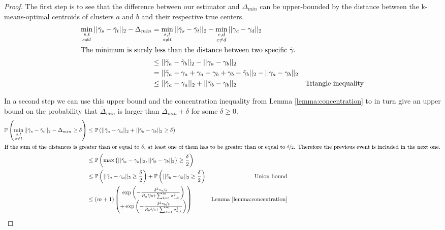 \documentclass[10pt,a4paper]{article}
\begin{document}
\begin{proof}
  The first step is to see that the difference between our estimator and $\Delta_{min}$ can be upper-bounded by the distance between the k-means-optimal centroids of clusters $a$ and $b$ and their respective true centers.
  \begin{align*}
    \min_{\substack{s, t\\s \ne t}} ||\tilde{\gamma}_{s} - \tilde{\gamma}_{t}||_{2} - \Delta_{min} & = \min_{\substack{s, t\\s \ne t}} ||\tilde{\gamma}_{s} - \tilde{\gamma}_{t}||_{2} - \min_{\substack{c, d\\c \ne d}} ||\gamma_{c} - \gamma_{d}||_{2}\\
    \intertext{The minimum is surely less than the distance between two specific $\tilde{\gamma}.$}
    & \le ||\tilde{\gamma}_{a} - \tilde{\gamma}_{b}||_{2} - ||\gamma_{a} - \gamma_{b}||_{2}\\
    & = ||\tilde{\gamma}_{a} - \gamma_{a} + \gamma_{a} - \gamma_{b} + \gamma_{b} - \tilde{\gamma}_{b}||_{2} - ||\gamma_{a} - \gamma_{b}||_{2}\\
    & \le ||\tilde{\gamma}_{a} - \gamma_{a}||_{2} + ||\tilde{\gamma}_{b} - \gamma_{b}||_{2} & \text{Triangle inequality}
  \end{align*}

  In a second step we can use this upper bound and the concentration inequality from Lemma \ref{lemma:concentration} to in turn give an upper bound on the probability that $\tilde{\Delta}_{min}$ is larger than $\Delta_{min} + \delta$ for some $\delta \ge 0$.
  \begin{align*}
    \mathbb{P}\left( \min_{\substack{s, t\\s \ne t}} ||\tilde{\gamma}_{s} - \tilde{\gamma}_{t}||_{2} - \Delta_{min} \ge \delta \right) & \le \mathbb{P}\left( ||\tilde{\gamma}_{a} - \gamma_{a}||_{2} + ||\tilde{\gamma}_{b} - \gamma_{b}||_{2} \ge \delta \right)\\
    \intertext{If the sum of the distances is greater than or equal to $\delta$, at least one of them has to be greater than or equal to $\nicefrac{\delta}{2}$.
    Therefore the previous event is included in the next one.}
    & \le \mathbb{P}\left( \max \left\{ ||\tilde{\gamma}_{a} - \gamma_{a}||_{2}, ||\tilde{\gamma}_{b} - \gamma_{b}||_{2} \right\} \ge \frac{\delta}{2} \right)\\
    & \le \mathbb{P}\left( ||\tilde{\gamma}_{a} - \gamma_{a}||_{2} \ge \frac{\delta}{2} \right) + \mathbb{P}\left( ||\tilde{\gamma}_{b} - \gamma_{b}||_{2} \ge \frac{\delta}{2} \right) & \text{Union bound}\\
    & \le (m + 1) \begin{pmatrix} \exp\left( -\frac{\delta^{2} \nicefrac{n_{a}}{8}}{R_{a} \nicefrac{\delta}{6} + \sum_{k = 1}^{m} \sigma_{a,k}^{2}} \right)\\ + \exp\left( -\frac{\delta^{2} \nicefrac{n_{b}}{8}}{R_{b} \nicefrac{\delta}{6} + \sum_{k = 1}^{m} \sigma_{b,k}^{2}} \right) \end{pmatrix} & \text{Lemma \ref{lemma:concentration}}
  \end{align*}
\end{proof}
\end{document}
